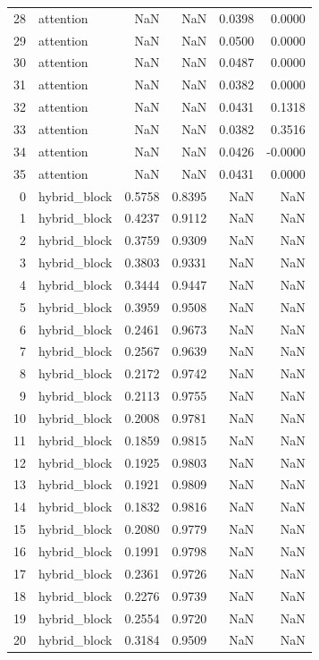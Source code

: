\begin{tabular}{rlrrrr}
28 & attention & NaN & NaN & 0.0398 & 0.0000 \\
29 & attention & NaN & NaN & 0.0500 & 0.0000 \\
30 & attention & NaN & NaN & 0.0487 & 0.0000 \\
31 & attention & NaN & NaN & 0.0382 & 0.0000 \\
32 & attention & NaN & NaN & 0.0431 & 0.1318 \\
33 & attention & NaN & NaN & 0.0382 & 0.3516 \\
34 & attention & NaN & NaN & 0.0426 & -0.0000 \\
35 & attention & NaN & NaN & 0.0431 & 0.0000 \\
0 & hybrid_block & 0.5758 & 0.8395 & NaN & NaN \\
1 & hybrid_block & 0.4237 & 0.9112 & NaN & NaN \\
2 & hybrid_block & 0.3759 & 0.9309 & NaN & NaN \\
3 & hybrid_block & 0.3803 & 0.9331 & NaN & NaN \\
4 & hybrid_block & 0.3444 & 0.9447 & NaN & NaN \\
5 & hybrid_block & 0.3959 & 0.9508 & NaN & NaN \\
6 & hybrid_block & 0.2461 & 0.9673 & NaN & NaN \\
7 & hybrid_block & 0.2567 & 0.9639 & NaN & NaN \\
8 & hybrid_block & 0.2172 & 0.9742 & NaN & NaN \\
9 & hybrid_block & 0.2113 & 0.9755 & NaN & NaN \\
10 & hybrid_block & 0.2008 & 0.9781 & NaN & NaN \\
11 & hybrid_block & 0.1859 & 0.9815 & NaN & NaN \\
12 & hybrid_block & 0.1925 & 0.9803 & NaN & NaN \\
13 & hybrid_block & 0.1921 & 0.9809 & NaN & NaN \\
14 & hybrid_block & 0.1832 & 0.9816 & NaN & NaN \\
15 & hybrid_block & 0.2080 & 0.9779 & NaN & NaN \\
16 & hybrid_block & 0.1991 & 0.9798 & NaN & NaN \\
17 & hybrid_block & 0.2361 & 0.9726 & NaN & NaN \\
18 & hybrid_block & 0.2276 & 0.9739 & NaN & NaN \\
19 & hybrid_block & 0.2554 & 0.9720 & NaN & NaN \\
20 & hybrid_block & 0.3184 & 0.9509 & NaN & NaN \\

\end{tabular}
